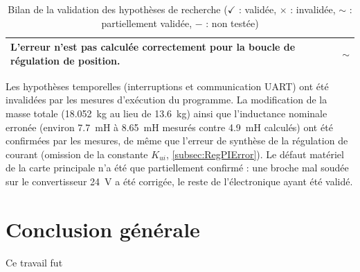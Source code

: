 \begin{table}[htbp]
\begin{tabular}{|p{12cm}|c|}
        \hline
        L'erreur n'est pas calculée correctement pour la boucle de régulation de position.                                                                   & $\sim$         \\
        \hline
    \end{tabular}
    \vspace{0.3cm}
    \caption{Bilan de la validation des hypothèses de recherche ($\checkmark$ : validée, $\times$ : invalidée, $\sim$ : partiellement validée, $-$ : non testée)}
    \label{tab:bilan_hypotheses}
\end{table}

Les hypothèses temporelles (interruptions et communication UART) ont été invalidées par les mesures d'exécution du programme. La modification de la masse totale (18.052~kg au lieu de 13.6~kg) ainsi que l'inductance nominale erronée (environ 7.7~mH à 8.65~mH mesurés contre 4.9~mH calculés) ont été confirmées par les mesures, de même que l'erreur de synthèse de la régulation de courant (omission de la constante $K_{ui}$, \autoref{subsec:RegPIError}). Le défaut matériel de la carte principale n'a été que partiellement confirmé : une broche mal soudée sur le convertisseur 24~V a été corrigée, le reste de l'électronique ayant été validé.

\section{Conclusion générale}
Ce travail fut

\vfil
\hspace{8cm}\makeatletter\@author\makeatother\par
\hspace{8cm}\begin{minipage}{5cm}
    \printsignature
\end{minipage}